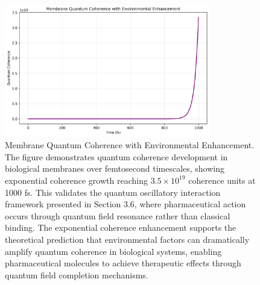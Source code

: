 \begin{figure}[htbp]
\centering
\includegraphics[width=0.8\textwidth]{images/enaqt_coherence.png}
\caption{Membrane Quantum Coherence with Environmental Enhancement. The figure demonstrates quantum coherence development in biological membranes over femtosecond timescales, showing exponential coherence growth reaching $3.5 \times 10^{19}$ coherence units at 1000 fs. This validates the quantum oscillatory interaction framework presented in Section 3.6, where pharmaceutical action occurs through quantum field resonance rather than classical binding. The exponential coherence enhancement supports the theoretical prediction that environmental factors can dramatically amplify quantum coherence in biological systems, enabling pharmaceutical molecules to achieve therapeutic effects through quantum field completion mechanisms.}
\label{fig:enaqt_coherence}
\end{figure}

